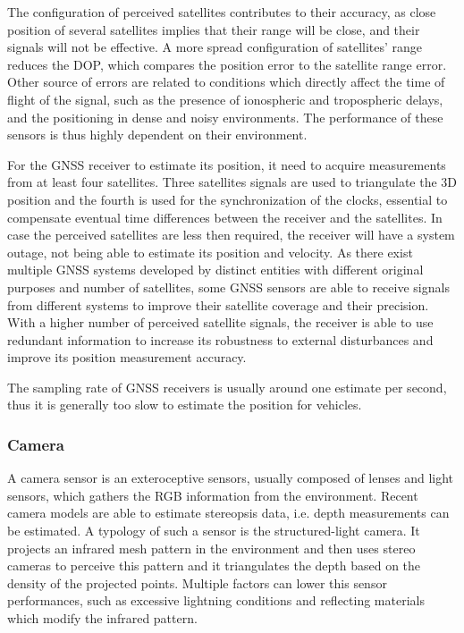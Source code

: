 The configuration of perceived satellites contributes to their accuracy, as close position of several satellites implies that their range will be close, and their signals will not be effective.
A more spread configuration of satellites' range reduces the \gls{DOP}, which compares the position error to the satellite range error.
Other source of errors are related to conditions which directly affect the time of flight of the signal, such as the presence of ionospheric and tropospheric delays, and the positioning in dense and noisy environments.
The performance of these sensors is thus highly dependent on their environment.

For the \gls{GNSS} receiver to estimate its position, it need to acquire measurements from at least four satellites.
Three satellites signals are used to triangulate the \gls{3D} position and the fourth is used for the synchronization of the clocks, essential to compensate eventual time differences between the receiver and the satellites.
In case the perceived satellites are less then required, the receiver will have a system outage, not being able to estimate its position and velocity.
As there exist multiple \gls{GNSS} systems developed by distinct entities with different original purposes and number of satellites, some \gls{GNSS} sensors are able to receive signals from different systems to improve their satellite coverage and their precision.
With a higher number of perceived satellite signals, the receiver is able to use redundant information to increase its robustness to external disturbances and improve its position measurement accuracy.

The sampling rate of \gls{GNSS} receivers is usually around one estimate per second, thus it is generally too slow to estimate the position for vehicles.


\subsubsection{Camera}

\noindent A camera sensor is an exteroceptive sensors, usually composed of lenses and light sensors, which gathers the \gls{RGB} information from the environment.
Recent camera models are able to estimate stereopsis data, i.e. depth measurements can be estimated.
A typology of such a sensor is the structured-light camera. It projects an infrared mesh pattern in the environment and then uses stereo cameras to perceive this pattern and it triangulates the depth based on the density of the projected points.
Multiple factors can lower this sensor performances, such as excessive lightning conditions and reflecting materials which modify the infrared pattern.

